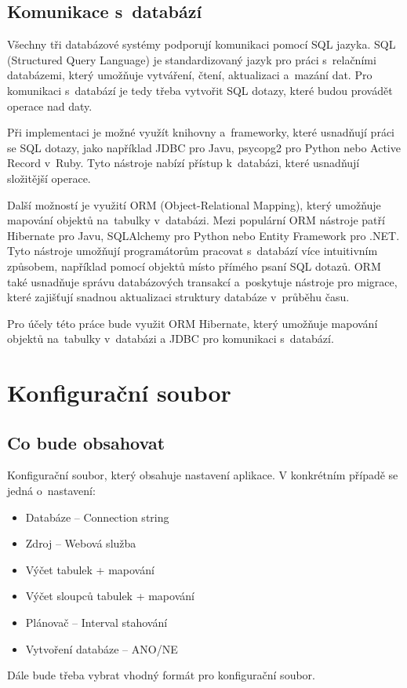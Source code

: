 \documentclass[czech, kiv, ba, he, iso690numb, pdf]{fasthesis}
\begin{document}
\section{Komunikace s~databází}
Všechny tři databázové systémy podporují komunikaci pomocí SQL jazyka.
SQL (Structured Query Language) je standardizovaný jazyk pro práci s~relačními databázemi,
který umožňuje vytváření, čtení, aktualizaci a~mazání dat.
Pro komunikaci s~databází je tedy třeba vytvořit SQL dotazy, které budou provádět operace nad daty.

Při implementaci je možné využít knihovny a~frameworky, které usnadňují práci se SQL dotazy, 
jako například JDBC pro Javu, psycopg2 pro Python nebo Active Record v~Ruby. 
Tyto nástroje nabízí přístup k~databázi, které usnadňují složitější operace.

Další možností je využití ORM (Object-Relational Mapping), který umožňuje mapování objektů na~tabulky v~databázi.
Mezi populární ORM nástroje patří Hibernate pro Javu, SQLAlchemy pro Python nebo Entity Framework pro .NET. 
Tyto nástroje umožňují programátorům pracovat s~databází více intuitivním způsobem, například pomocí objektů 
místo přímého psaní SQL dotazů. ORM také usnadňuje správu databázových transakcí a~poskytuje nástroje pro migrace, 
které zajišťují snadnou aktualizaci struktury databáze v~průběhu času.

Pro účely této práce bude využit ORM Hibernate, který umožňuje mapování objektů na~tabulky v~databázi a JDBC pro komunikaci s~databází.

\chapter{Konfigurační soubor}
\section{Co bude obsahovat}
Konfigurační soubor, který obsahuje nastavení aplikace.
V konkrétním případě se jedná o~nastavení:
\begin{itemize}
    \item Databáze -- Connection string
    \item Zdroj -- Webová služba
    \item Výčet tabulek + mapování
    \item Výčet sloupců tabulek + mapování
    \item Plánovač -- Interval stahování
    \item Vytvoření databáze -- ANO/NE
\end{itemize}
Dále bude třeba vybrat vhodný formát pro konfigurační soubor.
\end{document}
